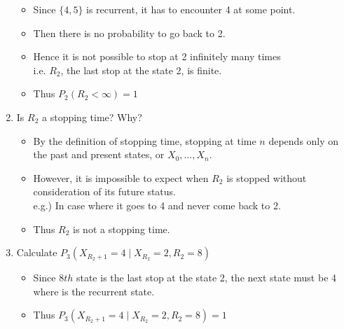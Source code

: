 \documentclass[12pt]{article}
\begin{document}
\begin{enumerate}[label=(\alph*)]
        \begin{itemize}
            \item Since $\{4,5\}$ is recurrent, it has to encounter 4 at some point.
            \item Then there is no probability to go back to 2.
            \item Hence it is not possible to stop at 2 infinitely many times\\
            i.e. $R_2$, the last stop at the state 2, is finite.
            \item Thus $P_2(R_2 < \infty) = 1$
        \end{itemize}
    \item Is $R_2$ a stopping time? Why?
        \begin{itemize}
            \item By the definition of stopping time, stopping at time $n$ depends only on the past and present states, or $X_0,...,X_n$.
            \item However, it is impossible to expect when $R_2$ is stopped without consideration of its future status.\\
            e.g.) In case where it goes to 4 and never come back to 2.
            \item Thus $R_2$ is not a stopping time.
        \end{itemize}
    \item Calculate $P_3(X_{R_2+1} = 4\;|\;X_{R_2} = 2, R_2 = 8)$
        \begin{itemize}
            \item Since $8th$ state is the last stop at the state 2, the next state must be 4 where is the recurrent state.
            \item Thus $P_3(X_{R_2+1} = 4\;|\;X_{R_2} = 2, R_2 = 8) = 1$
        \end{itemize}
\end{enumerate}

\vspace{1.5\baselineskip}
\noindent
\end{document}
